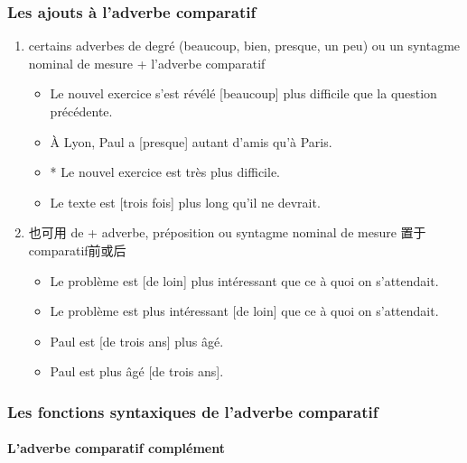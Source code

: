 \documentclass[UTF8]{report}
\begin{document}
\subsubsection{Les ajouts à l’adverbe comparatif}
\begin{enumerate}
    \item certains adverbes de degré (beaucoup, bien, presque, un peu) ou un syntagme nominal de mesure + l'adverbe comparatif
    \begin{itemize}
        \item Le nouvel exercice s’est révélé [beaucoup] plus difficile que la question précédente.
        \item À Lyon, Paul a [presque] autant d’amis qu’à Paris.
        \item * Le nouvel exercice est très plus difficile.
        \item Le texte est [trois fois] plus long qu’il ne devrait.
    \end{itemize}
    \item 也可用 de + adverbe, préposition ou syntagme nominal de mesure 置于comparatif前或后
    \begin{itemize}
        \item Le problème est [de loin] plus intéressant que ce à quoi on s’attendait.
        \item Le problème est plus intéressant [de loin] que ce à quoi on s’attendait.
        \item Paul est [de trois ans] plus âgé.
        \item Paul est plus âgé [de trois ans].
    \end{itemize}
\end{enumerate}

\subsubsection{Les fonctions syntaxiques de l’adverbe comparatif}

\paragraph{L’adverbe comparatif complément}
\end{document}
